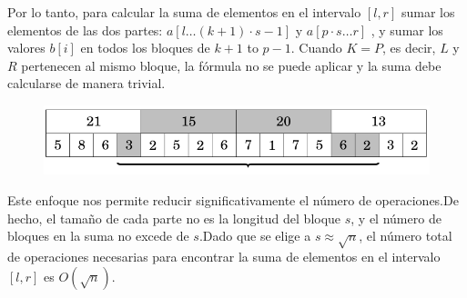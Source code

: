 Por lo tanto, para calcular la suma de elementos en el intervalo $[l, r]$  sumar los elementos de las dos partes:  $a[l\dots (k + 1)\cdot s-1]$ y $a[p\cdot s\dots r]$ , y sumar los valores $b[i]$ en todos los bloques de $k + 1$ to $p-1$. Cuando $ K = P $, es decir, $ L $ y $ R $ pertenecen al mismo bloque, la fórmula no se puede aplicar y la suma debe calcularse de manera trivial.

\begin{figure}[h!]
	\centering
	\includegraphics[width=0.7\linewidth]{img/srt_descomposition2}
	\label{fig:srtdescomposition2}
\end{figure}

Este enfoque nos permite reducir significativamente el número de operaciones.De hecho, el tamaño de cada parte no es la longitud del bloque $s$, y el número de bloques en la suma no excede de $s$.Dado que se elige a $s \approx \sqrt n$, el número total de operaciones necesarias para encontrar la suma de elementos en el intervalo $[l, r]$ es $O(\sqrt n)$.
